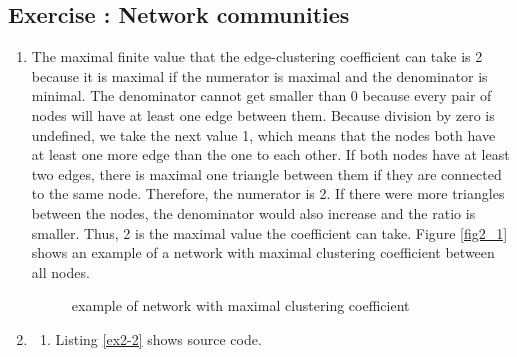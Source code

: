 \documentclass[10pt,a4paper]{article}
\newcommand{\exercise}[1]
{
  \stepcounter{subsection}
  \subsection*{Exercise \thesubsection: #1}

}
\begin{document}
\exercise{Network communities}
\begin{enumerate}
\item The maximal finite value that the edge-clustering coefficient can take is 2 because it is maximal if the numerator is maximal and the denominator is minimal. The denominator cannot get smaller than 0 because every pair of nodes will have at least one edge between them. Because division by zero is undefined, we take the next value 1, which means that the nodes both have at least one more edge than the one to each other. If both nodes have at least two edges, there is maximal one triangle between them if they are connected to the same node. Therefore, the numerator is 2. If there were more triangles between the nodes, the denominator would also increase and the ratio is smaller. Thus, 2 is the maximal value the coefficient can take. Figure \ref{fig2_1} shows an example of a network with maximal clustering coefficient between all nodes.\\
\newline
\begin{figure}
\begin{center}
\caption{example of network with maximal clustering coefficient}
\end{center}
\end{figure}

\item
\begin{enumerate}
\item Listing \ref{ex2-2} shows source code.


\end{enumerate}
\end{enumerate}
\end{document}
